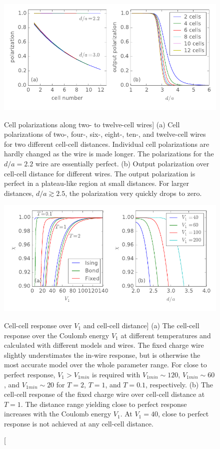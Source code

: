 \begin{figure}
  \center
  \includegraphics{wire_polarization}
  \caption
  [Cell polarizations along two- to twelve-cell wires]
  {
  (a) Cell polarizations of two-, four-, six-, eight-, ten-, and twelve-cell
  wires for two different cell-cell distances. Individual cell polarizations are
  hardly changed as the wire is made longer. The polarizations for the $d/a =
  2.2$ wire are essentially perfect.
  (b) Output polarization over cell-cell distance for different wires. The
  output polarization is perfect in a plateau-like region at small distances.
  For larger distances, $d/a \gtrsim 2.5$, the polarization very quickly drops
  to zero.
  }
  \label{fig:wire_polarization}

  \vspace*{1cm}
  
  \includegraphics{chis}
  \caption
  [Cell-cell response over $V_1$ and cell-cell distance]
  {
  (a) The cell-cell response over the Coulomb energy $V_1$ at different
  temperatures and calculated with different models and wires. The fixed charge
  wire slightly understimates the in-wire response, but is otherwise the most
  accurate model over the whole parameter range. For close to perfect response,
  $V_1 > V_{1min}$ is required with $V_{1min} \sim 120$, $V_{1min} \sim 60$, and
  $V_{1min} \sim 20$ for $T = 2$, $T = 1$, and $T = 0.1$, respectively.
  (b) The cell-cell response of the fixed charge wire over cell-cell distance at
  $T = 1$. The distance range yielding close to perfect response increases with
  the Coulomb energy $V_1$. At $V_1 = 40$, close to perfect response is not
  achieved at any cell-cell distance.
  }
  \label{fig:chis}
\end{figure}


